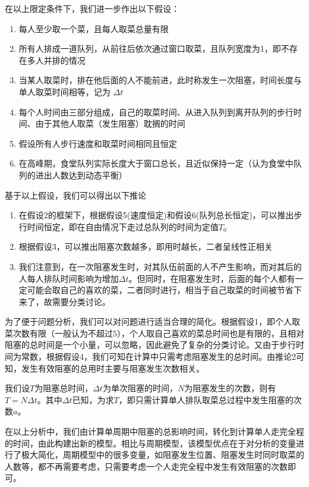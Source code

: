 \documentclass[lang=cn,10pt,a4paper]{elegantpaper}
\begin{document}
在以上限定条件下，我们进一步作出以下假设：


\begin{enumerate}
\item 每人至少取一个菜，且每人取菜总量有限
\item 所有人排成一道队列，从前往后依次通过窗口取菜，且队列宽度为1，即不存在多人并排的情况
\item 当某人取菜时，排在他后面的人不能前进，此时称发生一次阻塞，时间长度与单人取菜时间相等，记为 $\Delta t$
\item 每个人时间由三部分组成，自己的取菜时间、从进入队列到离开队列的步行时间、由于其他人取菜（发生阻塞）耽搁的时间
\item 假设所有人步行速度和取菜时间相同且恒定
\item 在高峰期，食堂队列实际长度大于窗口总长，且近似保持一定（认为食堂中队列的进出人数达到动态平衡）
\end{enumerate}


基于以上假设，我们可以得出以下推论
\begin{enumerate}
\item 在假设2的框架下，根据假设5(速度恒定)和假设6(队列总长恒定)，可以推出步行时间恒定，即在自由情况下走过总队列的时间为定值$T_0$
\item 根据假设3，可以推出阻塞次数越多，即用时越长，二者呈线性正相关
\item 我们注意到，在一次阻塞发生时，对其队伍前面的人不产生影响，而对其后的人每人排队时间影响为增加$\Delta t$。但同时，在阻塞发生时，后面的每个人都有一定可能会取自己的喜欢的菜，二者同时进行，相当于自己取菜的时间被节省下来了，故需要分类讨论。
\end{enumerate}


为了便于问题分析，我们可以对问题进行适当合理的简化。根据假设1，即个人取菜次数有限（一般认为不超过$5$），个人取自己喜欢的菜总时间也是有限的，且相对阻塞的总时间是一个小量，可以忽略，因此避免了复杂的分类讨论。又由于步行时间为常数，根据假设4，我们可知在计算中只需考虑阻塞发生的总时间。由推论2可知，发生有效阻塞的总用时主要与阻塞发生次数相关。


我们设$T$为阻塞总时间，$\Delta t$为单次阻塞的时间，$N$为阻塞发生的次数，则有$T = N\Delta t$。其中$\Delta t$已知，为求$T$，即只需计算单人排队取菜总过程中发生阻塞的次数$a$。


在以上分析中，我们由计算单周期中阻塞的总影响时间，转化到计算单人走完全程的时间，由此构建出新的模型。相比与周期模型，该模型优点在于对分析的变量进行了极大简化，周期模型中的很多变量，如阻塞发生位置、阻塞发生时同时取菜的人数等，都不再需要考虑，只需要考虑一个人走完全程中发生有效阻塞的次数即可。
\end{document}
